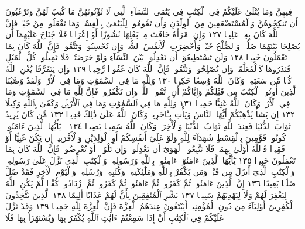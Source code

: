 فِيهِنَّ وَمَا يُتْلَىٰ عَلَيْكُمْ فِي ٱلْكِتَٰبِ فِي يَتَٰمَى ٱلنِّسَآءِ
ٱلَّٰتِي لَا تُؤْتُونَهُنَّ مَا كُتِبَ لَهُنَّ وَتَرْغَبُونَ أَن تَنكِحُوهُنَّ
وَٱلْمُسْتَضْعَفِينَ مِنَ ٱلْوِلْدَٰنِ وَأَن تَقُومُوا۟ لِلْيَتَٰمَىٰ بِٱلْقِسْطِۚ
وَمَا تَفْعَلُوا۟ مِنْ خَيْرࣲ فَإِنَّ ٱللَّهَ كَانَ بِهِۦ عَلِيمࣰا ١٢٧
وَإِنِ ٱمْرَأَةٌ خَافَتْ مِنۢ بَعْلِهَا نُشُوزًا أَوْ إِعْرَاضࣰا فَلَا جُنَاحَ
عَلَيْهِمَآ أَن يُصْلِحَا بَيْنَهُمَا صُلْحࣰاۚ وَٱلصُّلْحُ خَيْرࣱۗ
وَأُحْضِرَتِ ٱلْأَنفُسُ ٱلشُّحَّۚ وَإِن تُحْسِنُوا۟ وَتَتَّقُوا۟ فَإِنَّ ٱللَّهَ
كَانَ بِمَا تَعْمَلُونَ خَبِيرࣰا ١٢٨ وَلَن تَسْتَطِيعُوٓا۟ أَن تَعْدِلُوا۟
بَيْنَ ٱلنِّسَآءِ وَلَوْ حَرَصْتُمْۖ فَلَا تَمِيلُوا۟ كُلَّ ٱلْمَيْلِ فَتَذَرُوهَا
كَٱلْمُعَلَّقَةِۚ وَإِن تُصْلِحُوا۟ وَتَتَّقُوا۟ فَإِنَّ ٱللَّهَ كَانَ
غَفُورࣰا رَّحِيمࣰا ١٢٩ وَإِن يَتَفَرَّقَا يُغْنِ ٱللَّهُ كُلࣰّا مِّن سَعَتِهِۦۚ
وَكَانَ ٱللَّهُ وَٰسِعًا حَكِيمࣰا ١٣٠ وَلِلَّهِ مَا فِي ٱلسَّمَٰوَٰتِ
وَمَا فِي ٱلْأَرْضِۗ وَلَقَدْ وَصَّيْنَا ٱلَّذِينَ أُوتُوا۟ ٱلْكِتَٰبَ مِن
قَبْلِكُمْ وَإِيَّاكُمْ أَنِ ٱتَّقُوا۟ ٱللَّهَۚ وَإِن تَكْفُرُوا۟ فَإِنَّ لِلَّهِ
مَا فِي ٱلسَّمَٰوَٰتِ وَمَا فِي ٱلْأَرْضِۚ وَكَانَ ٱللَّهُ غَنِيًّا حَمِيدࣰا ١٣١
وَلِلَّهِ مَا فِي ٱلسَّمَٰوَٰتِ وَمَا فِي ٱلْأَرْضِۚ وَكَفَىٰ بِٱللَّهِ وَكِيلًا ١٣٢
إِن يَشَأْ يُذْهِبْكُمْ أَيُّهَا ٱلنَّاسُ وَيَأْتِ بِـَٔاخَرِينَۚ وَكَانَ
ٱللَّهُ عَلَىٰ ذَٰلِكَ قَدِيرࣰا ١٣٣ مَّن كَانَ يُرِيدُ ثَوَابَ ٱلدُّنْيَا فَعِندَ ٱللَّهِ
ثَوَابُ ٱلدُّنْيَا وَٱلْأٓخِرَةِۚ وَكَانَ ٱللَّهُ سَمِيعَۢا بَصِيرࣰا ١٣٤
۞ يَٰٓأَيُّهَا ٱلَّذِينَ ءَامَنُوا۟ كُونُوا۟ قَوَّٰمِينَ بِٱلْقِسْطِ شُهَدَآءَ لِلَّهِ وَلَوْ
عَلَىٰٓ أَنفُسِكُمْ أَوِ ٱلْوَٰلِدَيْنِ وَٱلْأَقْرَبِينَۚ إِن يَكُنْ غَنِيًّا أَوْ فَقِيرࣰا
فَٱللَّهُ أَوْلَىٰ بِهِمَاۖ فَلَا تَتَّبِعُوا۟ ٱلْهَوَىٰٓ أَن تَعْدِلُوا۟ۚ وَإِن تَلْوُۥٓا۟
أَوْ تُعْرِضُوا۟ فَإِنَّ ٱللَّهَ كَانَ بِمَا تَعْمَلُونَ خَبِيرࣰا ١٣٥ يَٰٓأَيُّهَا
ٱلَّذِينَ ءَامَنُوٓا۟ ءَامِنُوا۟ بِٱللَّهِ وَرَسُولِهِۦ وَٱلْكِتَٰبِ ٱلَّذِي نَزَّلَ
عَلَىٰ رَسُولِهِۦ وَٱلْكِتَٰبِ ٱلَّذِيٓ أَنزَلَ مِن قَبْلُۚ وَمَن يَكْفُرْ
بِٱللَّهِ وَمَلَٰٓئِكَتِهِۦ وَكُتُبِهِۦ وَرُسُلِهِۦ وَٱلْيَوْمِ ٱلْأٓخِرِ فَقَدْ ضَلَّ
ضَلَٰلَۢا بَعِيدًا ١٣٦ إِنَّ ٱلَّذِينَ ءَامَنُوا۟ ثُمَّ كَفَرُوا۟ ثُمَّ ءَامَنُوا۟ ثُمَّ
كَفَرُوا۟ ثُمَّ ٱزْدَادُوا۟ كُفْرࣰا لَّمْ يَكُنِ ٱللَّهُ لِيَغْفِرَ لَهُمْ وَلَا لِيَهْدِيَهُمْ
سَبِيلَۢا ١٣٧ بَشِّرِ ٱلْمُنَٰفِقِينَ بِأَنَّ لَهُمْ عَذَابًا أَلِيمًا ١٣٨ ٱلَّذِينَ
يَتَّخِذُونَ ٱلْكَٰفِرِينَ أَوْلِيَآءَ مِن دُونِ ٱلْمُؤْمِنِينَۚ أَيَبْتَغُونَ
عِندَهُمُ ٱلْعِزَّةَ فَإِنَّ ٱلْعِزَّةَ لِلَّهِ جَمِيعࣰا ١٣٩ وَقَدْ نَزَّلَ عَلَيْكُمْ فِي
ٱلْكِتَٰبِ أَنْ إِذَا سَمِعْتُمْ ءَايَٰتِ ٱللَّهِ يُكْفَرُ بِهَا وَيُسْتَهْزَأُ بِهَا فَلَا

